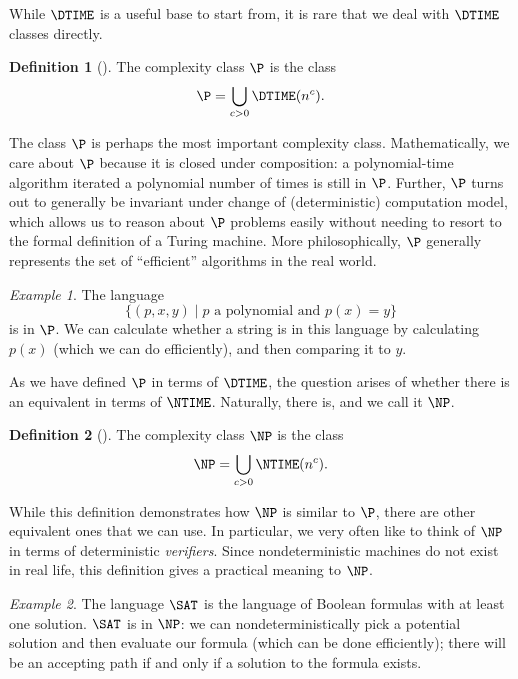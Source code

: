 \documentclass[english]{reedthesis}
\theoremstyle{plain}
\theoremstyle{definition}
\newtheorem{defn}[defn]{Definition}
\theoremstyle{remark}
\newtheorem{example}{Example}[thm]
\begin{document}
While $\DTIME$ is a useful base to start from, it is rare that we deal with
$\DTIME$ classes directly. %

\begin{defn}[{\cite[Def.\ 1.20]{AB09}}]\label{def:p}
  The complexity class $\P$ is the class
  \[
    \P = \bigcup_{c > 0}\DTIME(n^{c}).
  \]
\end{defn}

The class $\P$ is perhaps the most important complexity class. Mathematically,
we care about $\P$ because it is closed under composition: a polynomial-time
algorithm iterated a polynomial number of times is still in $\P$. Further, $\P$
turns out to generally be invariant under change of (deterministic) computation
model, which allows us to reason about $\P$ problems easily without needing to
resort to the formal definition of a Turing machine. More philosophically, $\P$
generally represents the set of ``efficient'' algorithms in the real world.

\begin{example}\label{ex:polynomial-is-p}
  The language
  \[
    \{(p, x, y) \mid p \text{ a polynomial and } p(x) = y\}
  \]
  is in $\P$. We can calculate whether a string is in this language by
  calculating $p(x)$ (which we can do efficiently), and then comparing it to
  $y$.
\end{example}

As we have defined $\P$ in terms of $\DTIME$, the question arises of whether
there is an equivalent in terms of $\NTIME$. Naturally, there is, and we call it
$\NP$.

\begin{defn}[{\cite[Cor.\ 7.22]{Sip97}}]\label{def:np}
  The complexity class $\NP$ is the class
  \[
    \NP = \bigcup_{c > 0}\NTIME(n^{c}).
  \]
\end{defn}

While this definition demonstrates how $\NP$ is similar to $\P$, there are other
equivalent ones that we can use. In particular, we very often like to think of
$\NP$ in terms of deterministic \emph{verifiers}. Since nondeterministic
machines do not exist in real life, this definition gives a practical meaning to
$\NP$.

\begin{example}\label{ex:sat-is-np}
  The language $\SAT$ is the language of Boolean formulas with at least one
  solution. $\SAT$ is in $\NP$: we can nondeterministically pick a potential
  solution and then evaluate our formula (which can be done efficiently); there
  will be an accepting path if and only if a solution to the formula exists.
\end{example}
\end{document}
